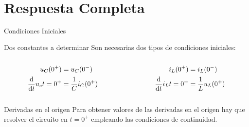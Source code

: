 \documentclass[aspectratio=169, usenames,svgnames,dvipsnames]{beamer}
\begin{document}
\section{Respuesta Completa}
\label{sec:org836db29}
\begin{frame}[label={sec:org342be1b}]{Condiciones Iniciales}
\begin{block}{Dos constantes a determinar}
Son necesarias dos tipos de condiciones iniciales:

\begin{columns}
\begin{column}{.5\columnwidth}
\begin{align*}
  u_C(0^+) &= u_C(0^-)\\
  \diff*{u_c}{t}{t = 0^+} &= \frac{1}{C} i_C(0^+)\\
\end{align*}
\end{column}

\begin{column}{.5\columnwidth}
\begin{align*}
  i_L(0^+) &= i_L(0^-)\\
  \diff*{i_L}{t}{t = 0^+} &= \frac{1}{L}u_L(0^+)\\
\end{align*}
\end{column}
\end{columns}
\end{block}

\begin{block}{Derivadas en el origen}
Para obtener valores de las derivadas en el origen hay que resolver el circuito en \(t = 0^+\) empleando las condiciones de continuidad.
\end{block}
\end{frame}
\end{document}
